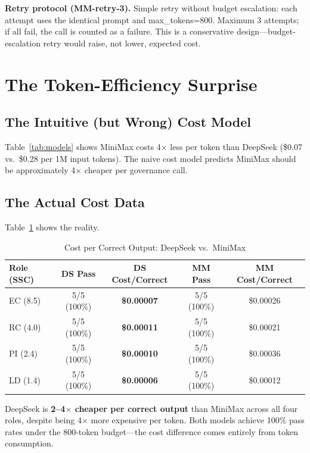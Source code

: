 \documentclass[11pt,a4paper]{article}
\begin{document}
\textbf{Retry protocol (MM-retry-3).} Simple retry without budget escalation: each attempt uses the identical prompt and max\_tokens=800. Maximum 3 attempts; if all fail, the call is counted as a failure. This is a conservative design---budget-escalation retry would raise, not lower, expected cost.

\section{The Token-Efficiency Surprise}

\subsection{The Intuitive (but Wrong) Cost Model}

Table~\ref{tab:models} shows MiniMax costs 4$\times$ less per token than DeepSeek (\$0.07 vs.\ \$0.28 per 1M input tokens). The naive cost model predicts MiniMax should be approximately 4$\times$ cheaper per governance call.

\subsection{The Actual Cost Data}

Table~\ref{tab:cost_matrix} shows the reality.

\begin{table}[htbp]\centering\caption{Cost per Correct Output: DeepSeek vs.\ MiniMax}\label{tab:cost_matrix}\small
\begin{tabular}{lcccc}\toprule\textbf{Role (SSC)} & \textbf{DS Pass} & \textbf{DS Cost/Correct} & \textbf{MM Pass} & \textbf{MM Cost/Correct}\\\midrule
EC (8.5) & 5/5 (100\%) & \textbf{\$0.00007} & 5/5 (100\%) & \$0.00026\\
RC (4.0) & 5/5 (100\%) & \textbf{\$0.00011} & 5/5 (100\%) & \$0.00021\\
PI (2.4) & 5/5 (100\%) & \textbf{\$0.00010} & 5/5 (100\%) & \$0.00036\\
LD (1.4) & 5/5 (100\%) & \textbf{\$0.00006} & 5/5 (100\%) & \$0.00012\\\bottomrule
\end{tabular}
\end{table}

DeepSeek is \textbf{2--4$\times$ cheaper per correct output} than MiniMax across all four roles, despite being 4$\times$ more expensive per token. Both models achieve 100\% pass rates under the 800-token budget---the cost difference comes entirely from token consumption.
\end{document}
